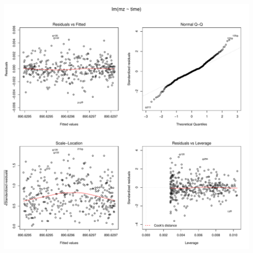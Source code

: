 \documentclass[]{article}
\begin{document}
\includegraphics{Supplementary_document_files/figure-latex/fit.lin.890-1.pdf}
\end{document}
